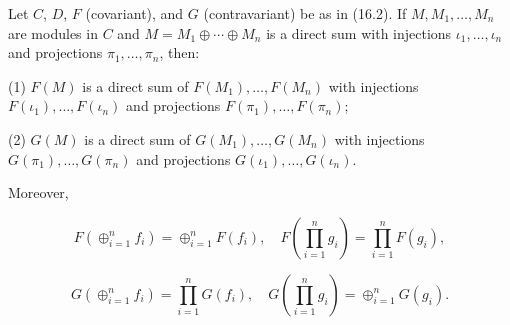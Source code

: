 Let $C$, $D$, $F$ (covariant), and $G$ (contravariant) be as in (16.2). If $M, M_1, \ldots, M_n$ are modules in $C$ and $M = M_1 \oplus \cdots \oplus M_n$ is a direct sum with injections $\iota_1, \ldots, \iota_n$ and projections $\pi_1, \ldots, \pi_n$, then:

(1) $F(M)$ is a direct sum of $F(M_1), \ldots, F(M_n)$ with injections $F(\iota_1), \ldots, F(\iota_n)$ and projections $F(\pi_1), \ldots, F(\pi_n)$;

(2) $G(M)$ is a direct sum of $G(M_1), \ldots, G(M_n)$ with injections $G(\pi_1), \ldots, G(\pi_n)$ and projections $G(\iota_1), \ldots, G(\iota_n)$.

Moreover,

$$F(\oplus_{i=1}^{n} f_i) = \oplus_{i=1}^{n} F(f_i), \quad F(\prod_{i=1}^{n} g_i) = \prod_{i=1}^{n} F(g_i),$$

$$G(\oplus_{i=1}^{n} f_i) = \prod_{i=1}^{n} G(f_i), \quad G(\prod_{i=1}^{n} g_i) = \oplus_{i=1}^{n} G(g_i).$$
